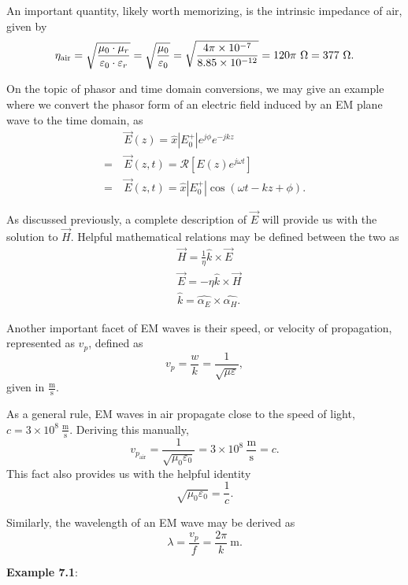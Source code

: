 \documentclass{article}
\begin{document}
An important quantity, likely worth memorizing, is the intrinsic impedance of air, given by
\[
	\eta_{\mathrm{air}} = \sqrt{\frac{\mu_0 \cdot \mu_r}{\varepsilon_0 \cdot \varepsilon_r}} = \sqrt{\frac{\mu_0}{\varepsilon_0}} = \sqrt{\frac{4\pi \times 10^{-7}}{8.85\times 10^{-12}}} = 120\pi \ \ohm = 377 \ \ohm.
\]

On the topic of phasor and time domain conversions, we may give an example where we convert the phasor form of an electric field induced by an EM plane wave to the time domain, as
\begin{align*}
	&\vec{E}(z) = \hat{x}|E_0^+|e^{j\phi}e^{-jkz} \\
	= \ &\vec{E}(z,t) = \mathcal{R}[E(z)e^{j\omega t}] \\
	= \ &\vec{E}(z,t) = \hat{x}|E_0^+|\cos{(\omega t - kz + \phi)}.
\end{align*}

As discussed previously, a complete description of \(\vec{E}\) will provide us with the solution to \(\vec{H}\). Helpful mathematical relations may be defined between the two as
\begin{align}
	&\vec{H} = \frac{1}{\eta} \hat{k} \times \vec{E} \\
	&\vec{E} = -\eta \hat{k} \times \vec{H} \\
	&\hat{k} = \hat{\alpha_E} \times \hat{\alpha_H}.
\end{align}

Another important facet of EM waves is their speed, or velocity of propagation, represented as \(v_p\), defined as 
\[
  v_p = \frac{w}{k} = \frac{1}{\sqrt{\mu\varepsilon}},
\]
given in \(\mathrm{\frac{m}{s}}\).

As a general rule, EM waves in air propagate close to the speed of light, \(c = 3\times10^8 \ \mathrm{\frac{m}{s}}\). Deriving this manually,
\[
	v_{p_{\mathrm{air}}} = \frac{1}{\sqrt{\mu_0\varepsilon_0}} = 3 \times 10^8 \ \mathrm{\frac{m}{s}} = c.
\]
This fact also provides us with the helpful identity
\[
  \sqrt{\mu_0\varepsilon_0} = \frac{1}{c}.
\]

Similarly, the wavelength of an EM wave may be derived as
\[
	\lambda = \frac{v_p}{f} = \frac{2\pi}{k} \ \mathrm{m}.
\]

\textbf{Example 7.1}:
\end{document}
